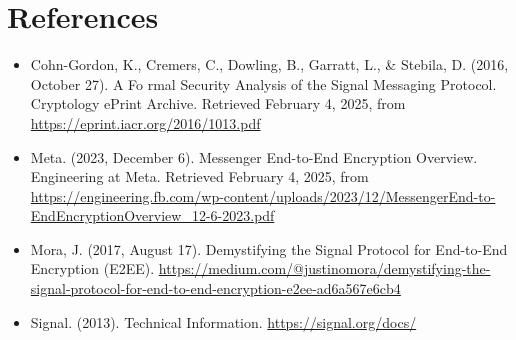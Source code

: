 \documentclass{article}
\theoremstyle{plain}
\begin{document}
\section{References}
\begin{itemize}
    \item Cohn-Gordon, K., Cremers, C., Dowling, B., Garratt, L., \& Stebila, D. (2016, October 27). A Fo  rmal Security Analysis of the Signal Messaging Protocol. Cryptology ePrint Archive. Retrieved February 4, 2025, from \url{https://eprint.iacr.org/2016/1013.pdf}
    \item Meta. (2023, December 6). Messenger End-to-End Encryption Overview. Engineering at Meta. Retrieved February 4, 2025, from \url{https://engineering.fb.com/wp-content/uploads/2023/12/MessengerEnd-to-EndEncryptionOverview_12-6-2023.pdf}
    \item Mora, J. (2017, August 17). Demystifying the Signal Protocol for End-to-End Encryption (E2EE). \url{https://medium.com/@justinomora/demystifying-the-signal-protocol-for-end-to-end-encryption-e2ee-ad6a567e6cb4}
    \item Signal. (2013). Technical Information. \url{https://signal.org/docs/}
\end{itemize}
\end{document}
